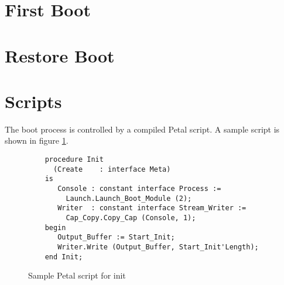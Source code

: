 \section{First Boot}

\section{Restore Boot}

\section{Scripts}

The boot process is controlled by a compiled Petal script.  A sample script is shown in figure {\ref{fig:init.petal}}.

\begin{figure}
    \centering
\begin{verbatim}
    procedure Init
      (Create    : interface Meta)
    is
       Console : constant interface Process :=
         Launch.Launch_Boot_Module (2);
       Writer  : constant interface Stream_Writer :=
         Cap_Copy.Copy_Cap (Console, 1);
    begin
       Output_Buffer := Start_Init;
       Writer.Write (Output_Buffer, Start_Init'Length);
    end Init;
\end{verbatim}
\caption{Sample Petal script for init}
    \label{fig:init.petal}
\end{figure}

